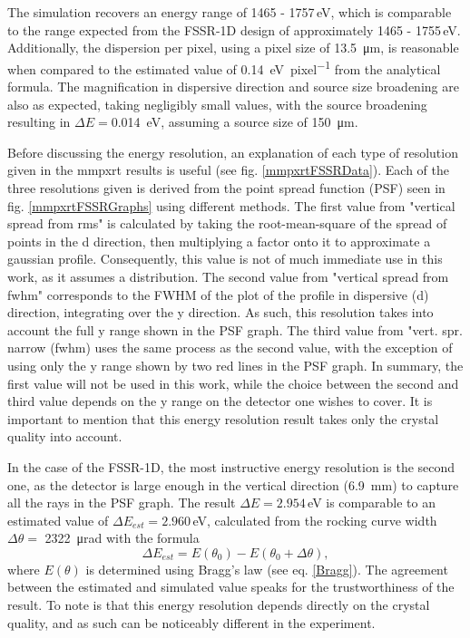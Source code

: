 The simulation recovers an energy range of 1465 - 
1757\,\si{\electronvolt}, 
which is comparable to the range expected from the FSSR-1D 
design of 
approximately 1465 - 1755\,\si{\electronvolt}. Additionally, the 
dispersion per pixel, using a pixel size of 
\SI{13.5}{\micro\meter}, is 
reasonable when 
compared to the estimated value of \SI{0.14}{\electronvolt\per 
pixel} from the 
analytical 
formula. The magnification in dispersive direction 
and source size broadening 
are also as 
expected, taking negligibly small values, with the 
source broadening resulting in $\Delta E = 
$\SI{0.014}{\electronvolt}, assuming a source size of 
\SI{150}{\micro\meter}.

Before discussing the energy resolution, an 
explanation of each type of resolution given in the 
mmpxrt results is useful (see fig. 
\ref{mmpxrtFSSRData}). Each of the three resolutions 
given is derived from the point spread function (PSF) 
seen in fig. \ref{mmpxrtFSSRGraphs} using different 
methods. The first value from "vertical spread from 
rms" is calculated by taking the root-mean-square of 
the spread of points in the d direction, then 
multiplying a factor onto it to approximate a 
gaussian profile. Consequently, this value is not of 
much immediate use in this work, as it assumes a 
distribution. The second value from "vertical spread 
from fwhm" corresponds to the FWHM of the plot of the 
profile in dispersive (d) direction, integrating over 
the y direction. As such, this resolution takes into 
account the full y range shown in the PSF graph. The 
third value from "vert. spr. narrow (fwhm) uses the 
same process as the second value, with the exception 
of using only the y range shown by two red lines in 
the PSF graph. In summary, the first value will not 
be used in this work, while the choice between the 
second and third value depends on the y range on the 
detector one wishes to cover. It is important to 
mention that this energy resolution result takes only 
the crystal quality into account.

In the case of the FSSR-1D, the most instructive 
energy resolution is the second one, as the detector 
is large enough in the vertical direction 
(\SI{6.9}{\milli\meter}) to capture all the rays in 
the PSF graph. The result $\Delta E = 
2.954$\,\si{\electronvolt} is comparable to an 
estimated value of $\Delta E_{est} = 
2.960$\,\si{\electronvolt}, calculated from the 
rocking curve width $\Delta\theta =$ 
\SI{2322}{\micro\radian} with the formula
\begin{equation}
	\Delta E_{est} = E(\theta_0) - E(\theta_0 + 
	\Delta\theta),
	\label{eq: energy resolution estimate}
\end{equation}
where $E(\theta)$ is determined using Bragg's law 
(see eq. \ref{Bragg}). The agreement between the 
estimated and simulated value speaks for the 
trustworthiness of the result. To note is that this 
energy resolution depends directly on the crystal 
quality, and 
as such can be noticeably different in the experiment.

